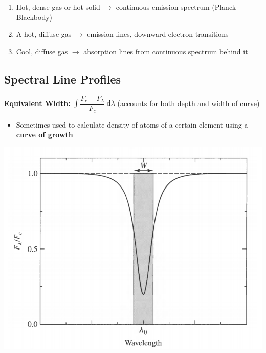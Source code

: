 \documentclass[12pt]{article}
\renewcommand{\dd}{\mathrm{d}}
\begin{document}
\begin{enumerate}
    \item Hot, dense gas or hot solid $\to$ continuous emission spectrum (Planck Blackbody)
    \item A hot, diffuse gas $\to$ emission lines, downward electron transitions
    \item Cool, diffuse gas $\to$ absorption lines from continuous spectrum behind it
\end{enumerate}

\subsection{Spectral Line Profiles}

\textbf{Equivalent Width:} $\int \dfrac{F_c - F_\lambda}{F_c}\;\dd\lambda$ (accounts for both depth and width of curve)
\begin{itemize}
    \item Sometimes used to calculate density of atoms of a certain element using a \textbf{curve of growth}
\end{itemize}

\includegraphics[scale=0.5]{Figures/EquivalentWidth.png}
\end{document}
